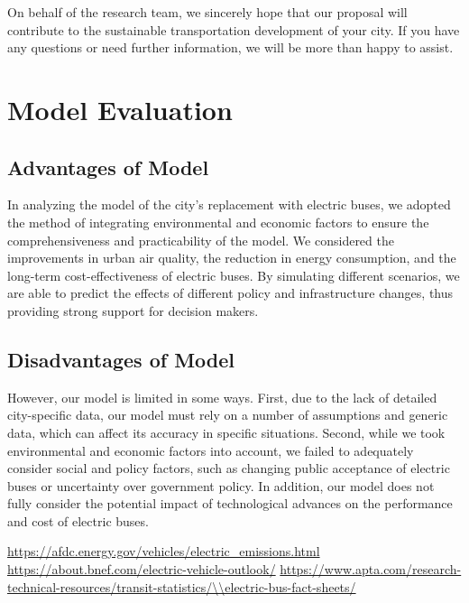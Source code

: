 \documentclass[12pt]{article}
\begin{document}
On behalf of the research team, we sincerely hope that our proposal will contribute to the sustainable transportation development 
of your city. If you have any questions or need further information, we will be more than happy to assist.


\newpage

\section{Model Evaluation}
\subsection{Advantages of Model}
In analyzing the model of the city's replacement with electric buses, we adopted the method of integrating 
environmental and economic factors to ensure the comprehensiveness and practicability of the model. We considered the 
improvements in urban air quality, the reduction in energy consumption, and the long-term cost-effectiveness of electric buses.
 By simulating different scenarios, we are able to predict the effects of different policy and infrastructure changes, thus 
 providing strong support for decision makers.
\subsection{Disadvantages of Model}
However, our model is limited in some ways. First, due to the lack of detailed city-specific data, our model must rely on a number of 
assumptions and generic data, which can affect its accuracy in specific situations. Second, while we took environmental and economic 
factors into account, we failed to adequately consider social and policy factors, such as changing public acceptance of electric buses 
or uncertainty over government policy. In addition, our model does not fully consider the potential impact of technological advances 
on the performance and cost of electric buses.


\newpage
\begin{thebibliography}{100}
\url{https://afdc.energy.gov/vehicles/electric_emissions.html}
\url{https://about.bnef.com/electric-vehicle-outlook/}
\url{https://www.apta.com/research-technical-resources/transit-statistics/\\electric-bus-fact-sheets/}
\end{thebibliography}
\end{document}
